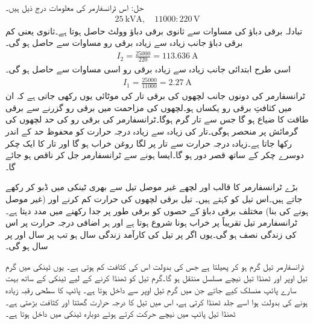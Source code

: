 حل:	اس ٹرانسفارمر کی معلومات درج ذیل ہیں۔
\begin{align*}
\SI{25}{\kilo \volt \ampere}, \quad 11000:220\,\si{\volt}
\end{align*}
تبادلہ برقی دباؤ کی مساوات سے  ثانوی  برقی دباؤ    وولٹ حاصل ہوتا ہے۔ثانوی  یعنی کم برقی دباؤ  جانب زیادہ سے زیادہ برقی رو مساوات   سے حاصل ہو گی۔
\begin{align*}
I_2=\frac{25000}{220}=\SI{113.636}{\ampere}
\end{align*}
اسی طرح  ابتدائی جانب زیادہ سے زیادہ برقی رو اسی مساوات سے حاصل ہو گی۔
\begin{align*}
I_1=\frac{25000}{11000}=\SI{2.27}{\ampere}
\end{align*}
%
ٹرانسفارمر کی دونوں جانب لچھوں کی  برقی تار کی موٹائی یوں رکھی جاتی ہے کہ ان میں کثافتِ برقی رو  یکساں ہو۔لچھوں کی مزاحمت میں برقی رو گزرنے سے برقی طاقت کا ضیاع ہو گا جس سے تار گرم ہوگا۔ٹرانسفارمر کی  برقی رو کی حد لچھوں کی گرمائش پر منحصر ہوگی۔تار کی زیادہ سے زیادہ درجہ حرارت کو محفوظ حد کے اندر رکھا جاتا ہے۔زیادہ درجہ حرارت سے تار پر لگا روغن خراب ہو گا اور تار کا ایک چکر دوسرے چکر کے ساتھ قصر دور ہو گا۔ایسا ہونے سے ٹرانسفارمر جل کر  ناقص ہو جائے گا۔ 

بڑے ٹرانسفارمر کا قالب اور لچھے  غیر موصل تیل سے بھری ٹینکی میں ڈبو کر رکھے جاتے ہیں۔اس تیل کو  کہتے ہیں۔ تیل برقی لچھوں کی حرارت کم کرنے  اور   (غیر موصل ہونے کی بنا) مختلف برقی دباؤ کے حصوں کو برقی طور پر جدا رکھنے میں مدد دیتا ہے۔ٹرانسفارمر تیل تقریباً   پر خراب ہونا شروع ہوتا ہے اور ہر  اضافی درجہ حرارت پر اس کی زندگی نصف   ہو گی۔یوں اگر  پر تیل کی کارآمد زندگی  سال ہو تب  پر  سال اور   پر      سال ہو گی۔

ٹرانسفارمر  تیل گرم ہو کر پھیلتا ہے جس کی بدولت اس کی کثافت کم ہوتی ہے۔ یوں  ٹینکی میں گرم تیل اوپر اور ٹھنڈا تیل نیچے مسلسل منتقل ہو گا۔گرم تیل کو ٹھنڈا کرنے کے لیے ٹینکی کے ساتھ بہت سارے پائپ منسلک کیے جاتے جن میں  گرم تیل  اوپر سے  داخل ہوتا ہے۔ پائپ کا سطحی رقبہ زیادہ ہونے کی بدولت ہوا اسے جلد ٹھنڈا کرتی ہے،  اس میں تیل کا درجہ حرارت گھٹتا اور  کثافت بڑھتی ہے۔ٹھنڈا تیل پائپ میں نیچے حرکت کرتے ہوئے دوبارہ ٹینکی میں داخل ہوتا ہے۔

